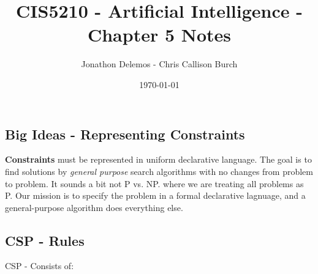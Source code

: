 \documentclass{article}
\title{CIS5210 - Artificial Intelligence - Chapter 5 Notes}
\author{Jonathon Delemos - Chris Callison Burch}
\date{\today}
\begin{document}
\maketitle

\subsection{Big Ideas - Representing Constraints}

\textbf{Constraints} must be represented in uniform declarative language. The goal is to find solutions by 
\textit{general purpose} search algorithms with no changes from problem to problem. It sounds a bit not P vs. NP.
where we are treating all problems as P. Our mission is to specify the problem in a formal declarative lagnuage, and a general-purpose algorithm 
does everything else.  

\subsection{CSP - Rules}

CSP - Consists of: 
\end{document}
